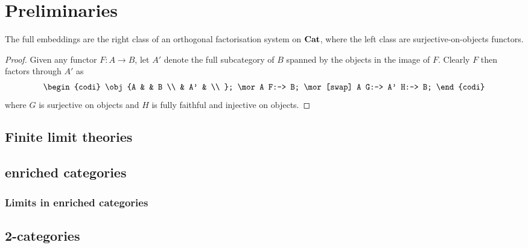 \documentclass[../thesis.tex]{subfiles}
\begin{document}
  \chapter{Preliminaries}

  
  \begin{lemma}
    The full embeddings are the right class of an orthogonal factorisation system on ${\mathbf{Cat}}$, where
    the left class are surjective-on-objects functors.
  \end{lemma}
  \begin{proof}
    Given any functor $F : A \to B$, let $A'$ denote the full subcategory of $B$ spanned by the
    objects in the image of $F$. Clearly $F$ then factors through $A'$ as
    \[\begin{codi}
      \obj {A & & B \\
            & A' & \\ };
      \mor A F:-> B;
      \mor[swap] A G:-> A' H:-> B;
    \end{codi}\]
    where $G$ is surjective on objects and $H$ is fully faithful and injective on objects.
  \end{proof}
  
  \section{Finite limit theories}

  \section{enriched categories}
  \label{sec:enriched}

  \subsection{Limits in enriched categories}
  \label{sec:enriched/limits}
  
  \section{2-categories}
  \label{sec:2-cats}
\end{document}
